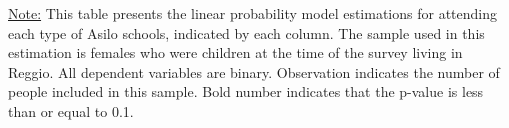 \begin{footnotesize}
\noindent\underline{Note:} This table presents the linear probability model estimations for attending each type of Asilo schools, indicated by each column. The sample used in this estimation is females who were children at the time of the survey living in Reggio. All dependent variables are binary. Observation indicates the number of people included in this sample. Bold number indicates that the p-value is less than or equal to 0.1.
\end{footnotesize}
